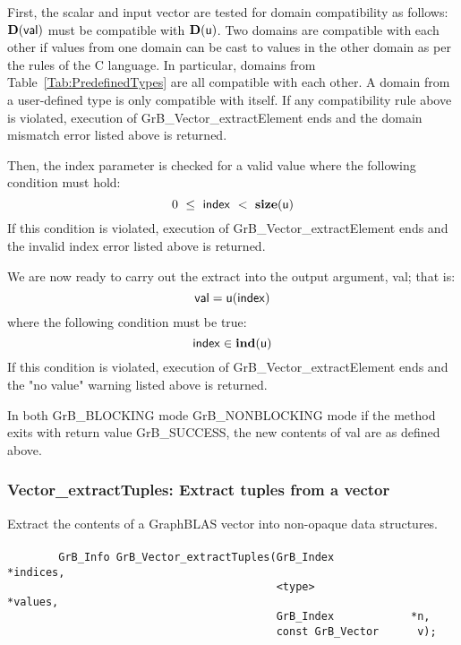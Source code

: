First, the scalar and input vector are tested for domain compatibility as follows:
$\mathbf{D}({\sf val})$ must be compatible with $\mathbf{D}({\sf u})$. Two domains 
are compatible with each other if values from one domain can be cast to values 
in the other domain as per the rules of the C language. In particular, domains 
from Table~\ref{Tab:PredefinedTypes} are all compatible with each other. A domain 
from a user-defined type is only compatible with itself. If any compatibility 
rule above is violated, execution of {\sf GrB\_Vector\_extractElement} ends and 
the domain mismatch error listed above is returned.

Then, the {\sf index} parameter is checked for a valid value where the following
condition must hold:
\[
	0\ \leq\ {\sf index}\ <\ \mathbf{size}({\sf u})
\]
If this condition is violated, execution of {\sf GrB\_Vector\_extractElement} 
ends and the invalid index error listed above is returned.

We are now ready to carry out the extract into the output argument, {\sf val};  
that is:
\[
    {\sf val} = {\sf u}({\sf index})
\]
where the following condition must be true:
\[
    {\sf index} \in \mathbf{ind}({\sf u})
\]
If this condition is violated, execution of {\sf GrB\_Vector\_extractElement} 
ends and the "no value" warning listed above is returned.

In both {\sf GrB\_BLOCKING} mode {\sf GrB\_NONBLOCKING} mode
if the method exits with return value {\sf GrB\_SUCCESS}, the new 
contents of {\sf val} are as defined above.  


\subsubsection{{\sf Vector\_extractTuples}: Extract tuples from a vector}
\label{Sec:Vector_extractTuples}

Extract the contents of a GraphBLAS vector into non-opaque data structures.

\paragraph{\syntax}

\begin{verbatim}
        GrB_Info GrB_Vector_extractTuples(GrB_Index            *indices,
                                          <type>               *values,
                                          GrB_Index            *n, 
                                          const GrB_Vector      v);

\end{verbatim}

